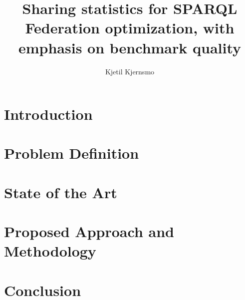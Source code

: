 \documentclass{llncs}
\begin{document}
\title{Sharing statistics for SPARQL Federation optimization, with
  emphasis on benchmark quality}
\author{Kjetil Kjernsmo}


\maketitle

\begin{abstract}


\end{abstract}

\section{Introduction}


\section{Problem Definition}

\section{State of the Art}


\section{Proposed Approach and Methodology}

\section{Conclusion}
\end{document}
